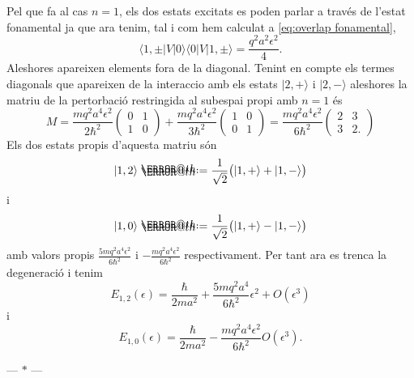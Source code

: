 \documentclass[12pt]{article}
\makeatletter
\numberwithin{table}{section}
\numberwithin{figure}{section}
\newcommand{\ket}[1]{\vert {#1} \rangle}
\newcommand{\bra}[1]{\langle #1 \vert}
\newcommand{\parbreak}{
	\begin{center}
		--- $\ast$ ---
	\end{center} 
}
\newcommand*{\defeq}{\mathrel{\rlap{%
    \raisebox{0.3ex}{$\m@th\cdot$}}%
  \raisebox{-0.3ex}{$\m@th\cdot$}}%
	=
}
\makeatother
\begin{document}
Pel que fa al cas \( n = 1 \), els dos estats excitats es poden parlar a través de l'estat fonamental ja que ara tenim, tal i com hem calculat a \cref{eq:overlap fonamental},
\begin{equation*}
	\bra{1,\pm}V\ket{0}\bra{0}V\ket{1,\pm} = \frac{q^2a^2\epsilon^2}{4}.
\end{equation*}
Aleshores apareixen elements fora de la diagonal. Tenint en compte els termes diagonals que apareixen de la interaccio amb els estats \( \ket{2,+} \) i \( \ket{2,-} \) aleshores la matriu de la pertorbació restringida al subespai propi amb \( n = 1 \) és
\begin{equation*}
	M = \frac{mq^2a^4\epsilon^2}{2\hbar^2}\begin{pmatrix}
		0 & 1 \\ 1 & 0
	\end{pmatrix} + \frac{mq^2a^4\epsilon^2}{3\hbar^2}\begin{pmatrix}
		1 & 0 \\ 0 & 1
	\end{pmatrix} = \frac{mq^2a^4\epsilon^2}{6\hbar^2}\begin{pmatrix}
		2 & 3 \\ 3 & 2.
	\end{pmatrix}
\end{equation*}
Els dos estats propis d'aquesta matriu són 
\begin{equation*}
	\ket{1,2} \defeq \frac{1}{\sqrt{2}}\big(\ket{1,+} + \ket{1,-}\big)
\end{equation*} i
\begin{equation*}
	\ket{1,0} \defeq \frac{1}{\sqrt{2}}\big(\ket{1,+} - \ket{1,-}\big) 
\end{equation*}
amb valors propis \( \frac{5mq^2a^4\epsilon^2}{6\hbar^2} \) i \( -\frac{mq^2a^4\epsilon^2}{6\hbar^2} \) respectivament. Per tant ara es trenca la degeneració i tenim
\begin{equation*}
	E_{1,2}(\epsilon) = \frac{\hbar}{2ma^2} + \frac{5mq^2a^4}{6\hbar^2}\epsilon^2 + O(\epsilon^3)
\end{equation*}
i
\begin{equation*}
	E_{1,0}(\epsilon) = \frac{\hbar}{2ma^2} - \frac{mq^2a^4\epsilon^2}{6\hbar^2} O(\epsilon^3).
\end{equation*}

\parbreak
\end{document}
